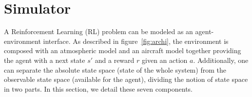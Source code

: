 \documentclass[]{article}
\begin{document}
%		
%		
%		
%		

\section*{Simulator}

A Reinforcement Learning (RL) problem can be modeled as an agent-environment interface. As described in figure~\ref{fig:archi}, the environment is composed with an atmospheric model and an aircraft model together providing the agent with a next state $s'$ and a reward $r$ given an action $a$. Additionally, one can separate the absolute state space (state of the whole system) from the observable state space (available for the agent), dividing the notion of state space in two parts. In this section, we detail these seven components.\\
\end{document}

